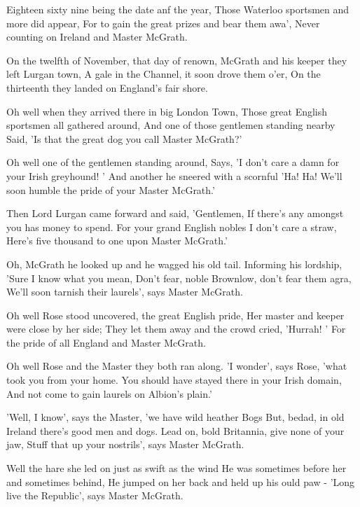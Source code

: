 \beginverse
Eighteen sixty nine being the date anf the year,
Those Waterloo sportsmen and more did appear,
For to gain the great prizes and bear them awa',
Never counting on Ireland and Master McGrath.
\endverse

\beginverse
On the twelfth of November, that day of renown,
McGrath and his keeper they left Lurgan town,
A gale in the Channel, it soon drove them o'er,
On the thirteenth they landed on England's fair shore.
\endverse

\beginverse
Oh well when they arrived there in big London Town,
Those great English sportsmen all gathered around,
And one of those gentlemen standing nearby
Said, 'Is that the great dog you call Master McGrath?'
\endverse

\beginverse
Oh well one of the gentlemen standing around,
Says, 'I don't care a damn for your Irish greyhound! '
And another he sneered with a scornful 'Ha! Ha!
We'll soon humble the pride of your Master McGrath.'
\endverse

\beginverse
Then Lord Lurgan came forward and said, 'Gentlemen,
If there's any amongst you has money to spend.
For your grand English nobles I don't care a straw,
Here's five thousand to one upon Master McGrath.'
\endverse

\beginverse
Oh, McGrath he looked up and he wagged his old tail.
Informing his lordship, 'Sure I know what you mean,
Don't fear, noble Brownlow, don't fear them agra,
We'll soon tarnish their laurels', says Master McGrath.
\endverse

\beginverse
Oh well Rose stood uncovered, the great English pride,
Her master and keeper were close by her side;
They let them away and the crowd cried, 'Hurrah! '
For the pride of all England and Master McGrath.
\endverse

\beginverse
Oh well Rose and the Master they both ran along.
'I wonder', says Rose, 'what took you from your home.
You should have stayed there in your Irish domain,
And not come to gain laurels on Albion's plain.'
\endverse

\beginverse
'Well, I know', says the Master, 'we have wild heather
Bogs
But, bedad, in old Ireland there's good men and dogs.
Lead on, bold Britannia, give none of your jaw,
Stuff that up your nostrils', says Master McGrath.
\endverse

\beginverse
Well the hare she led on just as swift as the wind
He was sometimes before her and sometimes behind,
He jumped on her back and held up his ould paw -
'Long live the Republic', says Master McGrath.
\endverse
\endsong